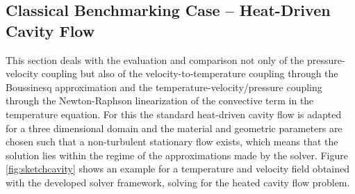 \subsection{Classical Benchmarking Case -- Heat-Driven Cavity Flow}

This section deals with the evaluation and comparison not only of the pressure-velocity coupling but also of the velocity-to-temperature coupling through the Boussinesq approximation and the temperature-velocity/pressure coupling through the Newton-Raphson linearization of the convective term in the temperature equation. For this the standard heat-driven cavity flow \cite{christon02,vahl83} is adapted for a three dimensional domain and the material and geometric parameters are chosen such that a non-turbulent stationary flow exists, which means that the solution lies within the regime of the approximations made by the solver. Figure \ref{fig:sketchcavity} shows an example for a temperature and velocity field obtained with the developed solver framework, solving for the heated cavity flow problem.

